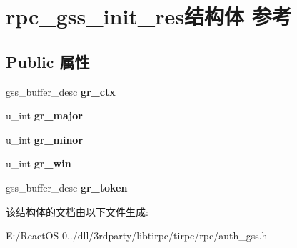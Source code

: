 \hypertarget{structrpc__gss__init__res}{}\section{rpc\+\_\+gss\+\_\+init\+\_\+res结构体 参考}
\label{structrpc__gss__init__res}
\subsection*{Public 属性}
\begin{DoxyCompactItemize}
\item 
\mbox{\label{structrpc__gss__init__res_abb718e5f9aef8c50c521b2ef5ef28261}} 
gss\+\_\+buffer\+\_\+desc {\bfseries gr\+\_\+ctx}
\item 
\mbox{\label{structrpc__gss__init__res_a4cfd433fd4ea9cc5acb0326ec15f4fc6}} 
u\+\_\+int {\bfseries gr\+\_\+major}
\item 
\mbox{\label{structrpc__gss__init__res_a16f89b38128cfe7f7c7077441c01727c}} 
u\+\_\+int {\bfseries gr\+\_\+minor}
\item 
\mbox{\label{structrpc__gss__init__res_ace2393c64ec3a830070f9d7f4d42ad88}} 
u\+\_\+int {\bfseries gr\+\_\+win}
\item 
\mbox{\label{structrpc__gss__init__res_aa49955927449cf017cf7eb4e765827a6}} 
gss\+\_\+buffer\+\_\+desc {\bfseries gr\+\_\+token}
\end{DoxyCompactItemize}


该结构体的文档由以下文件生成\+:\begin{DoxyCompactItemize}
\item 
E\+:/\+React\+O\+S-\/0../dll/3rdparty/libtirpc/tirpc/rpc/auth\+\_\+gss.\+h\end{DoxyCompactItemize}
